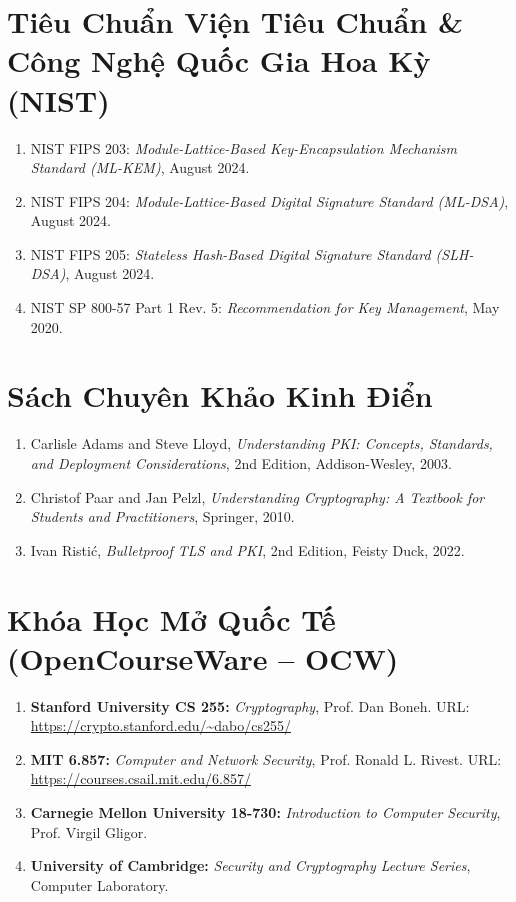 \section{Tiêu Chuẩn Viện Tiêu Chuẩn \& Công Nghệ Quốc Gia Hoa Kỳ (NIST)}
\begin{enumerate}
  \item NIST FIPS 203: \emph{Module-Lattice-Based Key-Encapsulation Mechanism Standard (ML-KEM)}, August 2024.
  \item NIST FIPS 204: \emph{Module-Lattice-Based Digital Signature Standard (ML-DSA)}, August 2024.
  \item NIST FIPS 205: \emph{Stateless Hash-Based Digital Signature Standard (SLH-DSA)}, August 2024.
  \item NIST SP 800-57 Part 1 Rev. 5: \emph{Recommendation for Key Management}, May 2020.
\end{enumerate}

\section{Sách Chuyên Khảo Kinh Điển}
\begin{enumerate}
  \item Carlisle Adams and Steve Lloyd, \emph{Understanding PKI: Concepts, Standards, and Deployment Considerations}, 2nd Edition, Addison-Wesley, 2003.
  \item Christof Paar and Jan Pelzl, \emph{Understanding Cryptography: A Textbook for Students and Practitioners}, Springer, 2010.
  \item Ivan Ristić, \emph{Bulletproof TLS and PKI}, 2nd Edition, Feisty Duck, 2022.
\end{enumerate}

\section{Khóa Học Mở Quốc Tế (OpenCourseWare -- OCW)}
\begin{enumerate}
  \item \textbf{Stanford University CS 255:} \emph{Cryptography}, Prof. Dan Boneh. URL: \url{https://crypto.stanford.edu/~dabo/cs255/}
  \item \textbf{MIT 6.857:} \emph{Computer and Network Security}, Prof. Ronald L. Rivest. URL: \url{https://courses.csail.mit.edu/6.857/}
  \item \textbf{Carnegie Mellon University 18-730:} \emph{Introduction to Computer Security}, Prof. Virgil Gligor.
  \item \textbf{University of Cambridge:} \emph{Security and Cryptography Lecture Series}, Computer Laboratory.
\end{enumerate}
